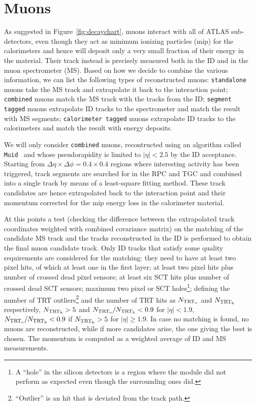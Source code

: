 \section{Muons}\label{sec:muons}

As suggested in Figure~\ref{fig:decaychart}, muons interact with all of ATLAS sub-detectors,
even though they act as minimum ionizing particles (mip) for the calorimeters and hence will deposit
only a very small fraction of their energy in the material. Their track instead is precisely
measured both in the ID and in the muon spectrometer (MS). Based on how we decide to combine
the various information, we can list the following types of reconstructed muons:
\texttt{standalone} muons take the MS track and extrapolate it back to the interaction point;
\texttt{combined} muons match the MS track with the tracks from the ID;
\texttt{segment tagged} muons extrapolate ID tracks to the spectrometer and match the result with MS segments;
\texttt{calorimeter tagged} muons extrapolate ID tracks to the calorimeters and match the result with
energy deposits. 

We will only consider \texttt{combined} muons, recontructed using an algorithm called \texttt{Muid}~\cite{ATLAS-CONF-2011-063}
and whose pseudorapidity is limited to $|\eta|<2.5$ by the ID acceptance.
Starting from $\Delta\eta\times\Delta\phi=0.4\times0.4$ regions where interesting activity has been triggered,
track segments are searched for in the RPC and TGC and combined into a single track by means of a
least-square fitting method. These track candidates are hence extrapolated back to the interaction
point and their momentum corrected for the mip energy loss in the calorimeter material.

At this points a \chisq test (checking the difference between the extrapolated track coordinates weighted with
combined covariance matrix) on the matching of the candidate MS track and the tracks reconstructed in 
the ID is performed to obtain the final muon candidate track. Only ID tracks that satisfy some quality 
requirements are considered for the matching: they need to have at least two pixel hits, of which at least
one in the first layer; at least two pixel hits plus number of crossed dead pixel sensors; at least six SCT hits
plus number of  crossed dead SCT sensors; maximum two pixel or SCT holes\footnote{A ``hole'' in the silicon
detectors is a region where the module did not perform as expected even though the surrounding ones did.};
defining the number of TRT outliers\footnote{``Outlier'' is an hit that is deviated from the track path.} 
and the number of TRT hits as $N_{\rm TRT_{o}}$ and  $N_{\rm TRT_{h}}$ respectively, 
$N_{\rm TRT_{h}}>5$ and $N_{\rm TRT_{o}}/N_{\rm TRT_{h}}<0.9$ for $|\eta|<1.9$, 
$N_{\rm TRT_{o}}/N_{\rm TRT_{h}}<0.9$ if $N_{\rm TRT_{h}}>5$ for  $|\eta|\geq1.9$.
In case no matching is found, no
muons are reconstructed, while if more candidates arise, the one giving the best \chisq is chosen.
The momentum is computed as a weighted average of ID and MS measurements.

